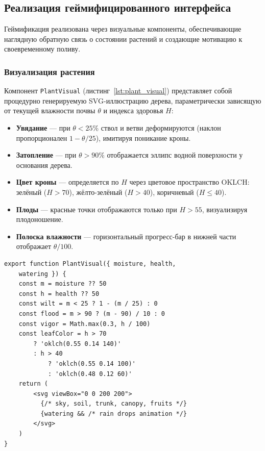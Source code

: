 \subsection{Реализация геймифицированного интерфейса}

Геймификация реализована через визуальные компоненты,
обеспечивающие наглядную обратную связь о состоянии растений
и создающие мотивацию к своевременному поливу.

\subsubsection{Визуализация растения}

Компонент \texttt{PlantVisual} (листинг~\ref{lst:plant_visual})
представляет собой процедурно генерируемую SVG-иллюстрацию
дерева, параметрически зависящую от текущей влажности почвы
$\theta$ и индекса здоровья $H$:

\begin{itemize}
    \item \textbf{Увядание} --- при $\theta < 25$\% ствол
    и ветви деформируются (наклон пропорционален
    $1 - \theta / 25$), имитируя поникание кроны.
    \item \textbf{Затопление} --- при $\theta > 90$\%
    отображается эллипс водной поверхности у основания
    дерева.
    \item \textbf{Цвет кроны} --- определяется по $H$ через
    цветовое пространство OKLCH: зелёный ($H > 70$),
    жёлто-зелёный ($H > 40$), коричневый ($H \leq 40$).
    \item \textbf{Плоды} --- красные точки отображаются
    только при $H > 55$, визуализируя плодоношение.
    \item \textbf{Полоска влажности} --- горизонтальный
    прогресс-бар в нижней части отображает $\theta / 100$.
\end{itemize}

\begin{lstlisting}[caption={Процедурная визуализация растения (visuals.jsx, фрагмент)}, label={lst:plant_visual}]
export function PlantVisual({ moisture, health,
    watering }) {
    const m = moisture ?? 50
    const h = health ?? 50
    const wilt = m < 25 ? 1 - (m / 25) : 0
    const flood = m > 90 ? (m - 90) / 10 : 0
    const vigor = Math.max(0.3, h / 100)
    const leafColor = h > 70
        ? 'oklch(0.55 0.14 140)'
        : h > 40
            ? 'oklch(0.55 0.14 100)'
            : 'oklch(0.48 0.12 60)'
    return (
        <svg viewBox="0 0 200 200">
          {/* sky, soil, trunk, canopy, fruits */}
          {watering && /* rain drops animation */}
        </svg>
    )
}
\end{lstlisting}

